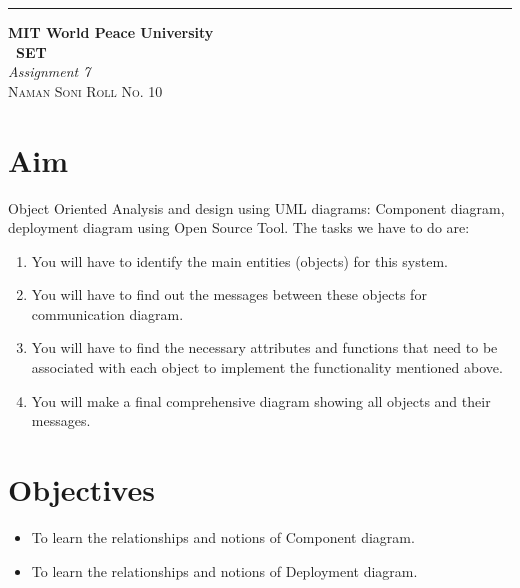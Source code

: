 \documentclass{article}
\begin{document}
\begin{titlepage} %

\raggedleft\rule{1pt}{\textheight} %
\hspace{0.05\textwidth} %
\parbox[b]{0.75\textwidth}
	{%

            {\Huge\bfseries MIT World Peace University \\[0.5\baselineskip] \ SET}\\[2\baselineskip] %
            {\large\textit{Assignment 7}}\\[4\baselineskip] %
            {\Large\textsc{Naman Soni Roll No. 10}} %

   \vspace{0.5\textheight} %
   }

\end{titlepage}
\tableofcontents
\pagebreak
\section{\textbf{Aim}}
Object Oriented Analysis and design using UML diagrams: Component diagram, deployment diagram using Open Source Tool.
The tasks we have to do are:
\begin{enumerate}
    \item You will have to identify the main entities (objects) for this system.
    \item You will have to find out the messages between these objects for communication diagram.
    \item You will have to find the necessary attributes and functions that need to be associated with each object to implement the functionality mentioned above.
    \item You will make a final comprehensive diagram showing all objects and their messages.
\end{enumerate}

\section{\textbf{Objectives}}
\begin{itemize}
    \item To learn the relationships and notions of Component diagram.
    \item To learn the relationships and notions of Deployment diagram.
\end{itemize}
\end{document}
